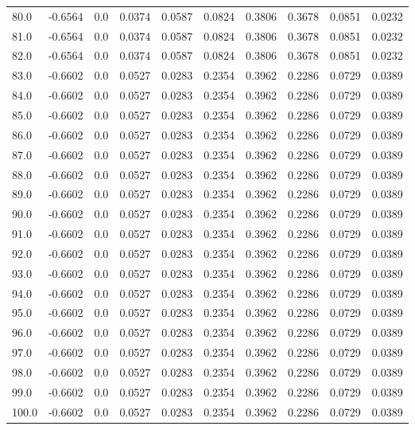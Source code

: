 \begin{longtable}{lrrrrrrrrr}
80.0 & -0.6564 & 0.0 & 0.0374 & 0.0587 & 0.0824 & 0.3806 & 0.3678 & 0.0851 & 0.0232 \\
81.0 & -0.6564 & 0.0 & 0.0374 & 0.0587 & 0.0824 & 0.3806 & 0.3678 & 0.0851 & 0.0232 \\
82.0 & -0.6564 & 0.0 & 0.0374 & 0.0587 & 0.0824 & 0.3806 & 0.3678 & 0.0851 & 0.0232 \\
83.0 & -0.6602 & 0.0 & 0.0527 & 0.0283 & 0.2354 & 0.3962 & 0.2286 & 0.0729 & 0.0389 \\
84.0 & -0.6602 & 0.0 & 0.0527 & 0.0283 & 0.2354 & 0.3962 & 0.2286 & 0.0729 & 0.0389 \\
85.0 & -0.6602 & 0.0 & 0.0527 & 0.0283 & 0.2354 & 0.3962 & 0.2286 & 0.0729 & 0.0389 \\
86.0 & -0.6602 & 0.0 & 0.0527 & 0.0283 & 0.2354 & 0.3962 & 0.2286 & 0.0729 & 0.0389 \\
87.0 & -0.6602 & 0.0 & 0.0527 & 0.0283 & 0.2354 & 0.3962 & 0.2286 & 0.0729 & 0.0389 \\
88.0 & -0.6602 & 0.0 & 0.0527 & 0.0283 & 0.2354 & 0.3962 & 0.2286 & 0.0729 & 0.0389 \\
89.0 & -0.6602 & 0.0 & 0.0527 & 0.0283 & 0.2354 & 0.3962 & 0.2286 & 0.0729 & 0.0389 \\
90.0 & -0.6602 & 0.0 & 0.0527 & 0.0283 & 0.2354 & 0.3962 & 0.2286 & 0.0729 & 0.0389 \\
91.0 & -0.6602 & 0.0 & 0.0527 & 0.0283 & 0.2354 & 0.3962 & 0.2286 & 0.0729 & 0.0389 \\
92.0 & -0.6602 & 0.0 & 0.0527 & 0.0283 & 0.2354 & 0.3962 & 0.2286 & 0.0729 & 0.0389 \\
93.0 & -0.6602 & 0.0 & 0.0527 & 0.0283 & 0.2354 & 0.3962 & 0.2286 & 0.0729 & 0.0389 \\
94.0 & -0.6602 & 0.0 & 0.0527 & 0.0283 & 0.2354 & 0.3962 & 0.2286 & 0.0729 & 0.0389 \\
95.0 & -0.6602 & 0.0 & 0.0527 & 0.0283 & 0.2354 & 0.3962 & 0.2286 & 0.0729 & 0.0389 \\
96.0 & -0.6602 & 0.0 & 0.0527 & 0.0283 & 0.2354 & 0.3962 & 0.2286 & 0.0729 & 0.0389 \\
97.0 & -0.6602 & 0.0 & 0.0527 & 0.0283 & 0.2354 & 0.3962 & 0.2286 & 0.0729 & 0.0389 \\
98.0 & -0.6602 & 0.0 & 0.0527 & 0.0283 & 0.2354 & 0.3962 & 0.2286 & 0.0729 & 0.0389 \\
99.0 & -0.6602 & 0.0 & 0.0527 & 0.0283 & 0.2354 & 0.3962 & 0.2286 & 0.0729 & 0.0389 \\
100.0 & -0.6602 & 0.0 & 0.0527 & 0.0283 & 0.2354 & 0.3962 & 0.2286 & 0.0729 & 0.0389 \\

\end{longtable}
